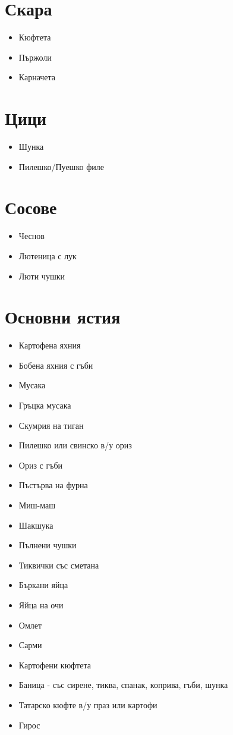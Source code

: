 \documentclass{article}
\newenvironment{mylist}
{
  \begin{itemize}
  \setlength{\itemsep}{1pt}
  \setlength{\parskip}{0pt}
  \setlength{\parsep}{0pt}
}
{
\end{itemize}
}
\begin{document}
\begin{multicols}{2}
\section{Скара}
\begin{mylist}
    \item{Кюфтета}
    \item{Пържоли}
    \item{Карначета}
\end{mylist}

\section{Цици}
\begin{mylist}
    \item{Шунка}
    \item{Пилешко/Пуешко филе}
\end{mylist}

\section{Сосове}
\begin{mylist}
    \item{Чеснов}
    \item{Лютеница с лук}
    \item{Люти чушки}
\end{mylist}

\section{Основни ястия}
\begin{mylist}
    \item{Картофена яхния}
    \item{Бобена яхния с гъби}
    \item{Мусака}
    \item{Гръцка мусака}
    \item{Скумрия на тиган}
    \item{Пилешко или свинско в/у ориз}
    \item{Ориз с гъби}
    \item{Пъстърва на фурна}
    \item{Миш-маш}
    \item{Шакшука}
    \item{Пълнени чушки}
    \item{Тиквички със сметана}
    \item{Бъркани яйца}
    \item{Яйца на очи}
    \item{Омлет}
    \item{Сарми}
    \item{Картофени кюфтета}
    \item{Баница - със сирене, тиква, спанак, коприва, гъби, шунка}
    \item{Татарско кюфте в/у праз или картофи}
    \item{Гирос}
\end{mylist}


\end{multicols}
\end{document}
